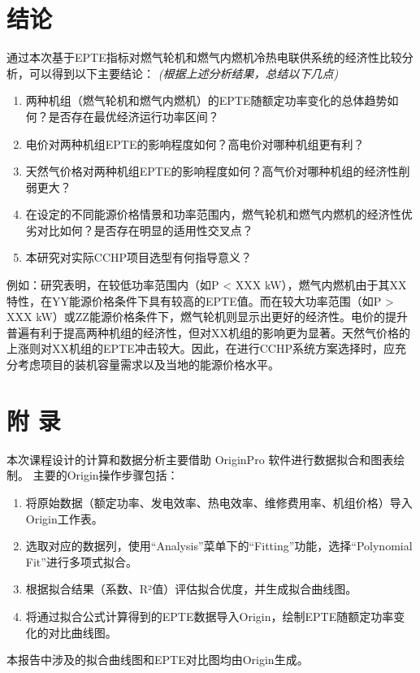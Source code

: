 \documentclass[12pt]{ctexart}
\begin{document}
\section{结论}
通过本次基于EPTE指标对燃气轮机和燃气内燃机冷热电联供系统的经济性比较分析，可以得到以下主要结论：
\textit{(根据上述分析结果，总结以下几点)}
\begin{enumerate}
    \item 两种机组（燃气轮机和燃气内燃机）的EPTE随额定功率变化的总体趋势如何？是否存在最优经济运行功率区间？
    \item 电价对两种机组EPTE的影响程度如何？高电价对哪种机组更有利？
    \item 天然气价格对两种机组EPTE的影响程度如何？高气价对哪种机组的经济性削弱更大？
    \item 在设定的不同能源价格情景和功率范围内，燃气轮机和燃气内燃机的经济性优劣对比如何？是否存在明显的适用性交叉点？
    \item 本研究对实际CCHP项目选型有何指导意义？
\end{enumerate}
例如：研究表明，在较低功率范围内（如P < XXX kW），燃气内燃机由于其XX特性，在YY能源价格条件下具有较高的EPTE值。而在较大功率范围（如P > XXX kW）或ZZ能源价格条件下，燃气轮机则显示出更好的经济性。电价的提升普遍有利于提高两种机组的经济性，但对XX机组的影响更为显著。天然气价格的上涨则对XX机组的EPTE冲击较大。因此，在进行CCHP系统方案选择时，应充分考虑项目的装机容量需求以及当地的能源价格水平。

\section*{附 录}
本次课程设计的计算和数据分析主要借助 OriginPro 软件进行数据拟合和图表绘制。
主要的Origin操作步骤包括：
\begin{enumerate}
    \item 将原始数据（额定功率、发电效率、热电效率、维修费用率、机组价格）导入Origin工作表。
    \item 选取对应的数据列，使用“Analysis”菜单下的“Fitting”功能，选择“Polynomial Fit”进行多项式拟合。
    \item 根据拟合结果（系数、R²值）评估拟合优度，并生成拟合曲线图。
    \item 将通过拟合公式计算得到的EPTE数据导入Origin，绘制EPTE随额定功率变化的对比曲线图。
\end{enumerate}
本报告中涉及的拟合曲线图和EPTE对比图均由Origin生成。

\end{document}
